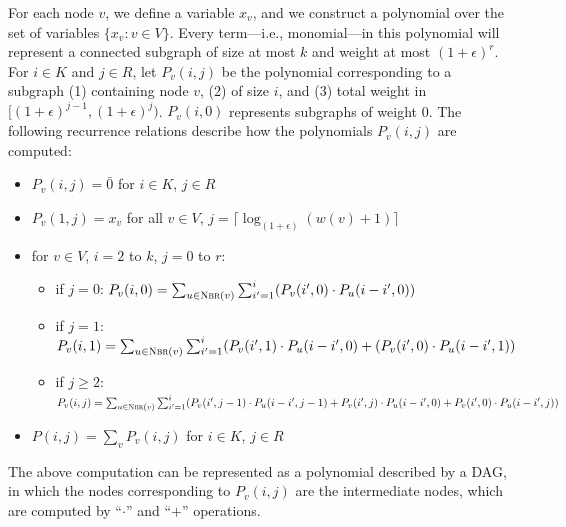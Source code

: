 For each node $v$, we define a variable $x_v$, and we construct a polynomial over the set of variables $\{x_v: v \in V\}$. Every term---i.e., monomial---in this polynomial will represent a connected subgraph of size at most $k$ and weight at most $(1+ \epsilon)^r$. 
For $i \in K$ and $j \in R$, let $P_v(i,j)$ be the polynomial corresponding to a subgraph (1) containing node $v$, (2) of size $i$, and (3) total weight in 
$[(1+ \epsilon)^{j-1}, (1+ \epsilon)^{j})$. $P_v(i,0)$ represents subgraphs of weight 0.
The following recurrence relations describe how the polynomials $P_v(i, j)$ are computed:
\begin{itemize}
\item
$P_v(i, j) = \bar{0}$ for $i \in K$, $j \in R$
\item
$P_v(1, j) = x_v$ for all $v \in V$, $j = \lceil \log_{(1 + \epsilon)} (w(v) + 1)\rceil$
\item
for $v \in V$, $i = 2$ to $k$, $j = 0$ to $r$:
\begin{itemize}
\item
if $j=0$: $P_v(i,0) = \sum_{u \in \textsc{Nbr}(v)} \sum_{i' = 1}^i (P_v(i',0) \cdot P_u(i-i', 0))$ 
\item
if $j=1$:
$P_v(i,1) = \sum_{u \in \textsc{Nbr}(v)} \sum_{i' = 1}^i (P_v(i', 1) \cdot P_u(i-i', 0) + (P_v(i', 0) \cdot P_u(i-i', 1))$
\item
if $j\geq 2$:
$P_v(i,j) = \sum_{u \in \textsc{Nbr}(v)} \sum_{i' = 1}^i (P_v(i', j - 1) \cdot P_u(i-i', j - 1) +
P_v(i', j) \cdot P_u(i-i', 0) + P_v(i', 0) \cdot P_u(i-i', j))$
\end{itemize}
\item
$P(i,j) = \sum_v P_v(i,j)$ for $i \in K$, $j \in R$
\end{itemize}

The above computation can be represented as a polynomial described by a DAG, in which the
nodes corresponding to $P_v(i, j)$ are the intermediate nodes, which are computed by ``$\cdot$'' and ``$+$''
operations.
